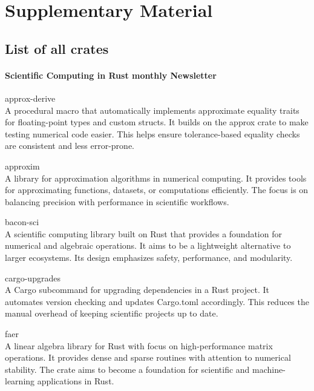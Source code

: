 \documentclass{article}
\begin{document}
\printbibliography

\pagebreak
{}
\renewcommand{\thesubsection}{S\arabic{supplementSection}}
\newcommand{\supplement}[1]{%
    \stepcounter{supplementSection}%
    \subsection{#1}
}
\renewcommand{\thesection}{}

\section{Supplementary Material}
\supplement{List of all crates}

\paragraph{Scientific Computing in Rust monthly Newsletter}

approx-derive\\
A procedural macro that automatically implements approximate equality traits for
floating-point types and custom structs. It builds on the approx crate to make testing numerical
code easier. This helps ensure tolerance-based equality checks are consistent and less error-prone.

approxim\\
A library for approximation algorithms in numerical computing. It provides tools for
approximating functions, datasets, or computations efficiently. The focus is on balancing precision
with performance in scientific workflows.

bacon-sci\\
A scientific computing library built on Rust that provides a foundation for numerical
and algebraic operations. It aims to be a lightweight alternative to larger ecosystems. Its design
emphasizes safety, performance, and modularity.

cargo-upgrades\\
A Cargo subcommand for upgrading dependencies in a Rust project. It automates
version checking and updates Cargo.toml accordingly. This reduces the manual overhead of keeping
scientific projects up to date.

faer\\
A linear algebra library for Rust with focus on high-performance matrix operations. It
provides dense and sparse routines with attention to numerical stability. The crate aims to become
a foundation for scientific and machine-learning applications in Rust.
\end{document}
